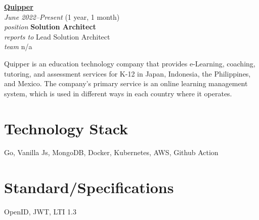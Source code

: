 \documentclass[12pt]{res} %
\begin{document}
\begin{resume}
\vspace{16pt} %
\begin{minipage}[t]{6.5cm}
\begin{flushleft}
	{\large {\bf \href{https://quipper.com}{Quipper}}} \\
	{\footnotesize{\sl June 2022--Present} \hfill (1 year, 1 month)}\\
	{\footnotesize{\sl position} \hfill \bf{Solution Architect}}\\
	{\footnotesize{\sl reports to} \hfill Lead Solution Architect}\\
	{\footnotesize{\sl team} \hfill n/a}\\
\end{flushleft}
\end{minipage}
\hspace{0.5cm}
\begin{minipage}[t]{0.56\linewidth}
	Quipper is an education technology company that provides e-Learning, coaching, tutoring, and assessment services for K-12 in Japan, Indonesia, the Philippines, and Mexico. The company's primary service is an online learning management system, which is used in different ways in each country where it operates.
\end{minipage}


\begin{multicols}{2}
	\section{Technology Stack}
		Go, Vanilla Js, MongoDB, Docker, Kubernetes, AWS, Github Action
	\section{Standard/Specifications}
		OpenID, JWT, LTI 1.3
\end{multicols}



\end{resume}
\end{document}
